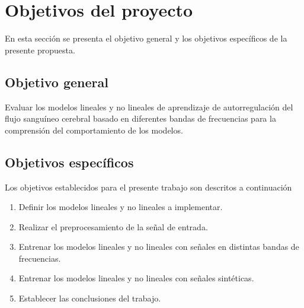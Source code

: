 \section{Objetivos del proyecto}
En esta sección se presenta el objetivo general y los objetivos específicos de la presente propuesta.

\subsection{Objetivo general}
Evaluar los modelos lineales y no lineales de aprendizaje de autorregulación del flujo sanguíneo cerebral basado en diferentes bandas de frecuencias para la comprensión del comportamiento de los modelos.

\subsection{Objetivos específicos}
Los objetivos establecidos para el presente trabajo son descritos a continuación
\begin{enumerate}
    \item Definir los modelos lineales y no lineales a implementar.
    \item Realizar el preprocesamiento de la señal de entrada.
    \item Entrenar los modelos lineales y no lineales con señales en distintas bandas de frecuencias.
    \item Entrenar los modelos lineales y no lineales con señales sintéticas.
    \item Establecer las conclusiones del trabajo.
\end{enumerate}
